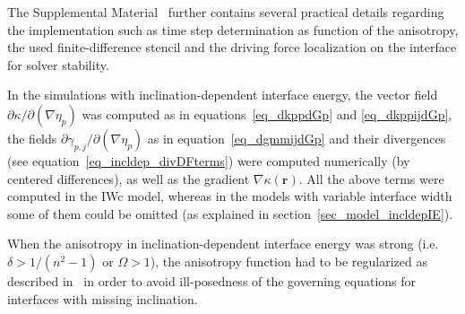 The Supplemental Material~\cite{Minar2021suppl} further contains several practical details regarding the implementation such as time step determination as function of the anisotropy, the used finite-difference stencil and the driving force localization on the interface for solver stability.

In the simulations with inclination-dependent interface energy, the vector field $\partial \kappa/\partial(\nabla\eta_p)$ was computed as in equations~\eqref{eq_dkppdGp} and \eqref{eq_dkppijdGp}, the fields $\partial \gamma_{p,j}/\partial(\nabla\eta_p)$ as in equation~\eqref{eq_dgmmijdGp} and their divergences (see equation~\eqref{eq_incldep_divDFterms}) were computed numerically (by centered differences), as well as the gradient $\nabla\kappa(\bm{r})$. All the above terms were computed in the IWc model, whereas in the models with variable interface width some of them could be omitted (as explained in section~\ref{sec_model_incldepIE}).

When the anisotropy in inclination-dependent interface energy was strong (i.e. $\delta>1/(n^2-1)$ or $\Omega>1$), the anisotropy function had to be regularized as described in~\cite{Eggleston2001} in order to avoid ill-posedness of the governing equations for interfaces with missing inclination.

